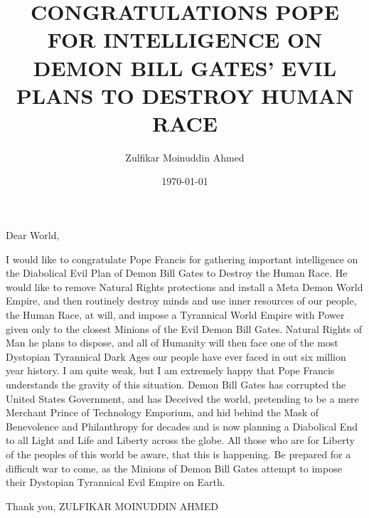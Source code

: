 \documentclass{amsart}
\title{CONGRATULATIONS POPE FOR INTELLIGENCE ON DEMON BILL GATES' EVIL PLANS TO DESTROY HUMAN RACE}
\author{Zulfikar Moinuddin Ahmed}
\date{\today}
\begin{document}
\maketitle



Dear World,

I would like to congratulate Pope Francis for gathering important intelligence on the Diabolical Evil Plan of Demon Bill Gates to Destroy the Human Race.  He would like to remove Natural Rights protections and install a Meta Demon World Empire, and then routinely destroy minds and use inner resources of our people, the Human Race, at will, and impose a Tyrannical World Empire with Power given only to the closest Minions of the Evil Demon Bill Gates.  Natural Rights of Man he plans to dispose, and all of Humanity will then face one of the most Dystopian Tyrannical Dark Ages our people have ever faced in out six million year history.  I am quite weak, but I am extremely happy that Pope Francis understands the gravity of this situation.  Demon Bill Gates has corrupted the United States Government, and has Deceived the world, pretending to be a mere Merchant Prince of Technology Emporium, and hid behind the Mask of Benevolence and Philanthropy for decades and is now planning a Diabolical End to all Light and Life and Liberty across the globe.   All those who are for Liberty of the peoples of this world be aware, that this is happening.  Be prepared for a difficult war to come, as the Minions of Demon Bill Gates attempt to impose their Dystopian Tyrannical Evil Empire on Earth.  

Thank you,
ZULFIKAR MOINUDDIN AHMED
\end{document}
